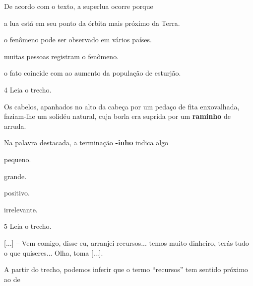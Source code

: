 \pagebreak
De acordo com o texto, a superlua ocorre porque

\begin{escolha}
\item a lua está em seu ponto da órbita mais próximo da Terra.

\item o fenômeno pode ser observado em vários países.

\item muitas pessoas registram o fenômeno.

\item o fato coincide com ao aumento da população de esturjão.
\end{escolha}


\num{4} Leia o trecho.

\begin{myquote}
Os cabelos, apanhados no alto da cabeça por um pedaço de fita
enxovalhada, faziam-lhe um solidéu natural, cuja borla era suprida por
um \textbf{raminho} de arruda.

\end{myquote}

Na palavra destacada, a terminação \textbf{-inho} indica algo

\begin{escolha}
\item pequeno.

\item grande.

\item positivo.

\item irrelevante.
\end{escolha}


\num{5} Leia o trecho.

\begin{myquote}
{[}...{]} – Vem comigo, disse eu, arranjei recursos... temos muito
dinheiro, terás tudo o que quiseres... Olha, toma {[}...{]}.

\end{myquote}

A partir do trecho, podemos inferir que o termo “recursos” tem sentido próximo ao de

